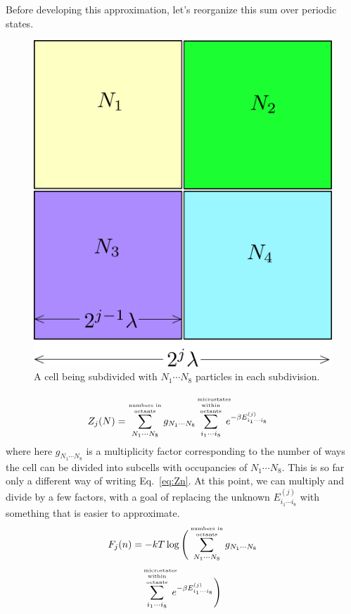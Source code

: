 \documentclass[letterpaper,twocolumn,amsmath,amssymb,pre,aps,10pt]{revtex4-1}
\begin{document}
Before developing this approximation, let's reorganize this sum over
periodic states.
\begin{figure}
  \centering
  \includegraphics[width=0.8\columnwidth]{figs/divisions}
  \caption{A cell being subdivided with $N_1\cdots N_8$ particles in
    each subdivision.}
\end{figure}
\newcommand\sumoccupanciesofoctants{
  \sum_{N_1\cdots N_8}^{\text{\tiny\begin{minipage}{5em}
      \begin{center}
      \tiny numbers in octants\end{center}\end{minipage}}}
}
\newcommand\summicrostatesofoctants{
  \sum_{i_1\cdots i_8}^{\text{\tiny\begin{minipage}{4em}
      \begin{center}
      \tiny microstates\\within octants\end{center}\end{minipage}}}
}
\begin{align}
  Z_j(N) &= \sumoccupanciesofoctants g_{N_1\cdots N_8}
       \summicrostatesofoctants
       e^{-\beta E_{i_1\cdots i_8}^{(j)}}
\end{align}
where here $g_{N_1\cdots N_8}$ is a multiplicity factor
corresponding to the number of ways the cell can be divided into
subcells with occupancies of $N_1\cdots N_8$.  This is so far only a
different way of writing Eq.~\ref{eq:Zn}.  At this point, we can
multiply and divide by a few factors, with a goal of replacing the
unknown $E_{i_1\cdots i_8}^{(j)}$ with something that is easier to
approximate.
\begin{multline}
  F_j(n) = -kT\log\Bigg(
    \sumoccupanciesofoctants
       g_{N_1\cdots N_8}
       \\
       \summicrostatesofoctants
       e^{-\beta E_{i_1\cdots i_8}^{(j)}}
  \Bigg)
\end{multline}
\end{document}
